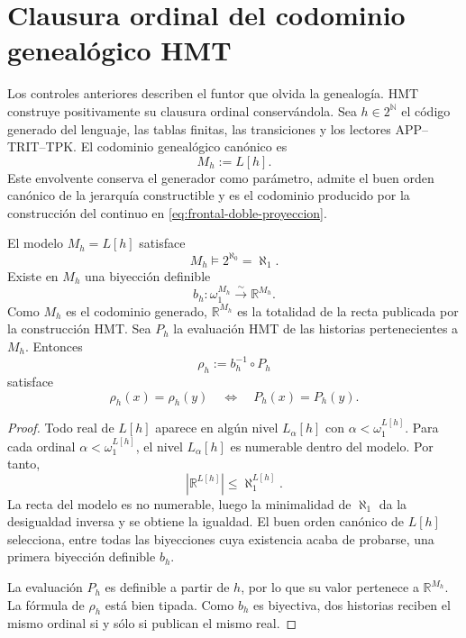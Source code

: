 \section{Clausura ordinal del codominio genealógico HMT}

Los controles anteriores describen el funtor que olvida la genealogía. HMT
construye positivamente su clausura ordinal conservándola. Sea
\(h\in2^{\mathbb N}\) el código generado del lenguaje, las tablas finitas,
las transiciones y los lectores APP--TRIT--TPK. El codominio genealógico
canónico es
\[
 M_h:=L[h].
\]
Este envolvente conserva el generador como parámetro, admite el buen orden
canónico de la jerarquía constructible y es el codominio producido por la
construcción del continuo en \eqref{eq:frontal-doble-proyeccion}.

\begin{theorem}
\label{p12-83-c19-s1:hmtch:thm-ch-relativa}
El modelo \(M_h=L[h]\) satisface
\[
 M_h\models 2^{\aleph_0}=\aleph_1.
\]
Existe en \(M_h\) una biyección definible
\[
 b_h:\omega_1^{M_h}\xrightarrow{\ \sim\ }\mathbb R^{M_h}.
\]
Como \(M_h\) es el codominio generado, \(\mathbb R^{M_h}\) es la totalidad de
la recta publicada por la construcción HMT. Sea \(P_h\) la evaluación HMT de
las historias pertenecientes a \(M_h\). Entonces
\[
 \rho_h:=b_h^{-1}\circ P_h
\]
satisface
\[
 \rho_h(x)=\rho_h(y)
 \quad\Longleftrightarrow\quad
 P_h(x)=P_h(y).
\]
\end{theorem}

\begin{proof}
Todo real de \(L[h]\) aparece en algún nivel
\(L_\alpha[h]\) con \(\alpha<\omega_1^{L[h]}\). Para cada ordinal
\(\alpha<\omega_1^{L[h]}\), el nivel \(L_\alpha[h]\) es numerable dentro
del modelo. Por tanto,
\[
 |\mathbb R^{L[h]}|\leq\aleph_1^{L[h]}.
\]
La recta del modelo es no numerable, luego la minimalidad de \(\aleph_1\)
da la desigualdad inversa y se obtiene la igualdad. El buen orden canónico
de \(L[h]\) selecciona, entre todas las biyecciones cuya existencia acaba
de probarse, una primera biyección definible \(b_h\).

La evaluación \(P_h\) es definible a partir de \(h\), por lo que su valor
pertenece a \(\mathbb R^{M_h}\). La fórmula de \(\rho_h\) está bien tipada.
Como \(b_h\) es biyectiva, dos historias reciben el mismo ordinal si y sólo
si publican el mismo real.
\end{proof}

